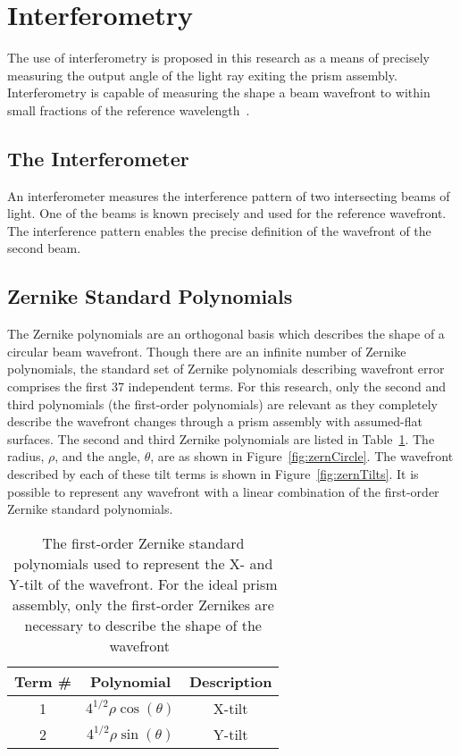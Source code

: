\section{Interferometry}
\label{sec:interferometry}
The use of interferometry is proposed in this research as a means of precisely measuring the output angle of the light ray exiting the prism assembly. Interferometry is capable of measuring the shape a beam wavefront to within small fractions of the reference wavelength~\cite{ZygoMan}.

\subsection{The Interferometer}
\label{sec:interferometer}
An interferometer measures the interference pattern of two intersecting beams of light. One of the beams is known precisely and used for the reference wavefront. The interference pattern enables the precise definition of the wavefront of the second beam.

\subsection{Zernike Standard Polynomials}
\label{sec:zernikes}
The Zernike polynomials are an orthogonal basis which describes the shape of a circular beam wavefront. Though there are an infinite number of Zernike polynomials, the standard set of Zernike polynomials describing wavefront error comprises the first 37 independent terms. For this research, only the second and third polynomials (the first-order polynomials) are relevant as they completely describe the wavefront changes through a prism assembly with assumed-flat surfaces. The second and third Zernike polynomials are listed in Table~\ref{tbl:zernTable}. The radius, $\rho$, and the angle, $\theta$, are as shown in Figure~\ref{fig:zernCircle}. The wavefront described by each of these tilt terms is shown in Figure~\ref{fig:zernTilts}. It is possible to represent any wavefront with a linear combination of the first-order Zernike standard polynomials.

\begin{table}[htb] 
\caption{The first-order Zernike standard polynomials used to represent the X- and Y-tilt of the wavefront. For the ideal prism assembly, only the first-order Zernikes are necessary to describe the shape of the wavefront~\cite{Wyant,Sue,Zemax}} %
\label{tbl:zernTable}
\centering %
\begin{tabular}{ c c c} %
\hline
Term \# & Polynomial & Description\\  %
\hline %
1 & $4^{1/2}\rho \cos(\theta)$ & X-tilt\\
2 & $4^{1/2}\rho \sin(\theta)$ & Y-tilt\\
\end{tabular} 
\end{table}

